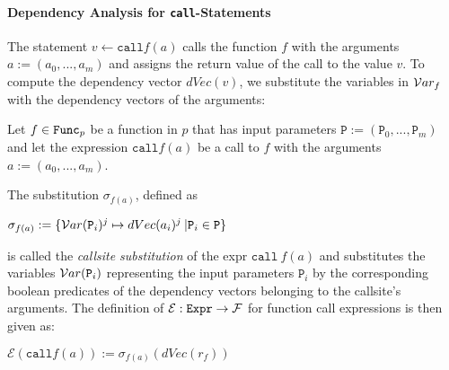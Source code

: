 

\paragraph{Dependency Analysis for \texttt{call}-Statements}
The statement $v \leftarrow \mathtt{call} f(a)$ calls the function $f$ with the arguments $a := (a_0,..., a_m)$ and assigns the return value of the call to the value $v$. To compute the dependency vector $dVec(v)$, we substitute the variables in $\mathcal{V}ar_f$ with the dependency vectors of the arguments:

\begin{definition}
    Let $f \in \mathtt{Func}_p$ be a function in $p$ that has input parameters $\mathtt{P} := (\mathtt{P}_0,...,\mathtt{P}_m)$ and let the expression $\mathtt{call} f(a)$ be a call to $f$ with the arguments $a := (a_0,..., a_m)$.
    
    The substitution $\sigma_{f(a)}$, defined as
    \begin{center}
        $\sigma_{f(a)} := \{ \mathcal{V}ar(\mathtt{P}_i)^j \mapsto dVec(a_i)^j \: |  \mathtt{P}_i \in \mathtt{P}\}$
    \end{center}
    is called the \emph{callsite substitution} of the expr $\mathtt{call} \: f(a)$ and substitutes the variables $\mathcal{V}ar(\mathtt{P}_i)$ representing the input parameters $\mathtt{P}_i$ by the corresponding boolean predicates of the dependency vectors belonging to the callsite's arguments.
    The definition of $\mathcal{E}: \mathtt{Expr} \to \mathcal{F}$ for function call expressions is then given as:
    \begin{center}
        $\mathcal{E}(\mathtt{call} f(a)) := \sigma_{f(a)} (dVec(r_f))$
    \end{center}
\end{definition}

